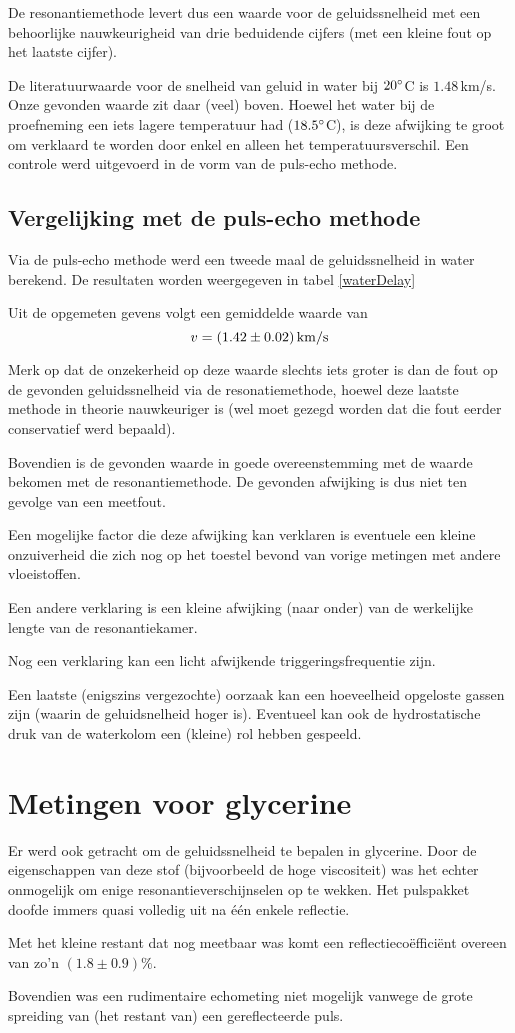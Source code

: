 De resonantiemethode levert dus een waarde voor de geluidssnelheid met een 
behoorlijke nauwkeurigheid van drie beduidende cijfers (met een kleine fout 
op het laatste cijfer).

De literatuurwaarde voor de snelheid van geluid in water bij $20^\circ$C is 
$1.48\,$km/s. Onze gevonden waarde zit daar (veel) boven. Hoewel het water 
bij de proefneming een iets lagere temperatuur had ($18.5^\circ$C), is deze 
afwijking te groot om verklaard te worden door enkel en alleen het 
temperatuursverschil. Een controle werd uitgevoerd in de vorm van de 
puls-echo methode.

\subsection{Vergelijking met de puls-echo methode}
Via de puls-echo methode werd een tweede maal de geluidssnelheid in water 
berekend. De resultaten worden weergegeven in tabel \ref{waterDelay}

\waterDelay

Uit de opgemeten gevens volgt een gemiddelde waarde van
$$
v = (1.42 \pm 0.02)\,\rm km/s
$$

Merk op dat de onzekerheid op deze waarde slechts iets groter is dan de 
fout op de gevonden geluidssnelheid via de resonatiemethode, hoewel deze 
laatste methode in theorie nauwkeuriger is (wel moet gezegd worden dat die 
fout eerder conservatief werd bepaald).

Bovendien is de gevonden waarde in goede overeenstemming met de waarde 
bekomen met de resonantiemethode. De gevonden afwijking is dus niet ten 
gevolge van een meetfout.

Een mogelijke factor die deze afwijking kan verklaren is eventuele een 
kleine onzuiverheid die zich nog op het toestel bevond van vorige metingen 
met andere vloeistoffen.

Een andere verklaring is een kleine afwijking (naar onder) van de 
werkelijke lengte van de resonantiekamer.

Nog een verklaring kan een licht afwijkende triggeringsfrequentie zijn.

Een laatste (enigszins vergezochte) oorzaak kan een hoeveelheid opgeloste 
gassen zijn (waarin de geluidsnelheid hoger is). Eventueel kan ook de 
hydrostatische druk van de waterkolom een (kleine) rol hebben gespeeld.





\section{Metingen voor glycerine}
Er werd ook getracht om de geluidssnelheid te bepalen in glycerine. Door de 
eigenschappen van deze stof (bijvoorbeeld de hoge viscositeit) was het 
echter onmogelijk om enige resonantieverschijnselen op te wekken. Het 
pulspakket doofde immers quasi volledig uit na \'e\'en enkele reflectie.

Met het kleine restant dat nog meetbaar was komt een 
reflectieco\"effici\"ent overeen van zo'n $(1.8 \pm 0.9)\%$.

Bovendien was een rudimentaire echometing niet mogelijk vanwege de grote 
spreiding van (het restant van) een gereflecteerde puls.

